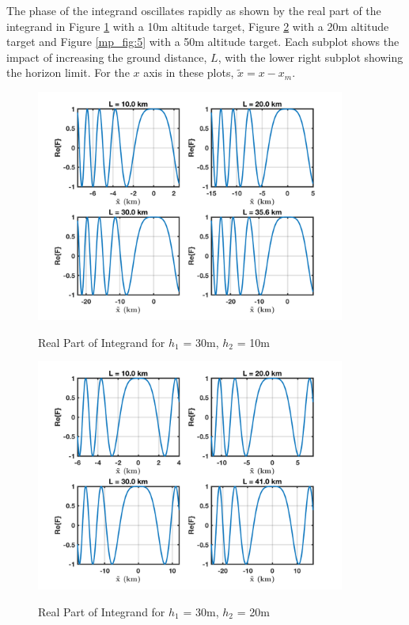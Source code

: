 The phase of the integrand oscillates rapidly as shown by the real part of the integrand in Figure \ref{mp_fig:3} with a 10m altitude target, Figure \ref{mp_fig:4} with a 20m altitude target and Figure \ref{mp_fig:5} with a 50m altitude target. Each subplot shows the impact of increasing the ground distance, $L$, with the lower right subplot showing the horizon limit. For the $x$ axis in these plots, $\tilde{x} = x-x_m$.

\begin{figure}[H]
  \begin{center}
\includegraphics[width=4in]{../media/analysis/phaseVariation_30_10}
  \end{center}
  \renewcommand{\baselinestretch}{1} \small\normalsize
  \begin{quote}
    \caption[Real Part of Integrand for $h_1$ = 30m, $h_2$ = 10m]{ Real Part of Integrand for $h_1$ = 30m, $h_2$ = 10m\label{mp_fig:3}}
  \end{quote}
\end{figure}
\renewcommand{\baselinestretch}{2} \small\normalsize

\begin{figure}[H]
  \begin{center}
\includegraphics[width=4in]{../media/analysis/phaseVariation_30_20}
  \end{center}
  \renewcommand{\baselinestretch}{1} \small\normalsize
  \begin{quote}
  \caption[Real Part of Integrand for $h_1$ = 30m, $h_2$ = 20m]{ Real Part of Integrand for $h_1$ = 30m, $h_2$ = 20m\label{mp_fig:4}}
  \end{quote}
\end{figure}
\renewcommand{\baselinestretch}{2} \small\normalsize

